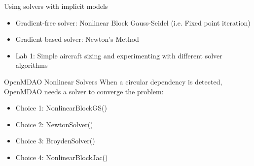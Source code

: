 \documentclass[aspectratio=169, usenames,dvipsnames, 14pt]{beamer}
\begin{document}

\begingroup
{}
\begin{frame}{Using solvers with implicit models}

    \begin{itemize}
        \item Gradient-free solver: Nonlinear Block Gauss-Seidel (i.e. Fixed point iteration)  
        \vspace{0.5cm}
        \item Gradient-based solver: Newton’s Method
        \vspace{0.5cm}
        \item Lab 1: Simple aircraft sizing and experimenting with different solver algorithms
    \end{itemize}
\end{frame}
\endgroup


\begin{frame}{OpenMDAO Nonlinear Solvers}
    When a circular dependency is detected, OpenMDAO needs a solver to converge the problem:
    
    \begin{itemize}
        \item Choice 1: NonlinearBlockGS()
        \item Choice 2: NewtonSolver()
        \item Choice 3: BroydenSolver()
        \item Choice 4: NonlinearBlockJac()
    \end{itemize}
\end{frame}

\end{document}
